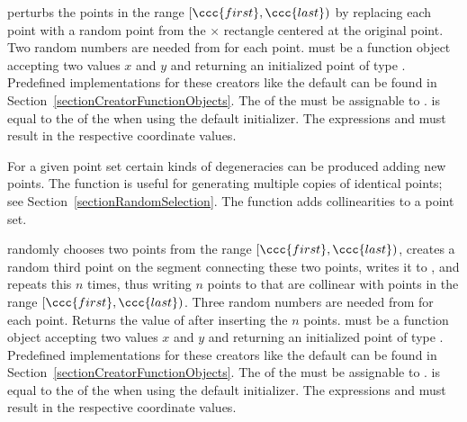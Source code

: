 { perturbs the points in the range $[\ccc{first},\ccc{last})$ by
  replacing each point with a random point from the 
   $\times$  rectangle centered at the original point.
  Two random numbers are needed from  for each point.
  \ccPrecond   {} must be a function object accepting two
     values $x$ and $y$ and returning an initialized point
     of type . Predefined implementations for these
    creators like the default can be found in
    Section~\ref{sectionCreatorFunctionObjects}. The  of the
     must be assignable to .
     is equal to the  of the
     when using the default initializer.
    The expressions  and
     must result in the respective
    coordinate values.
}


For a given point set certain kinds of degeneracies can be produced
adding new points. The  function is
useful for generating multiple copies of identical points; see
Section~\ref{sectionRandomSelection}. The
 function adds collinearities to
a point set.


\def\ccLongParamLayout{\ccTrue}
{ randomly chooses two points from the range $[\ccc{first},\ccc{last})$,
    creates a random third point on the segment connecting these two
    points, writes it to , and repeats this $n$ times, thus
    writing $n$ points to  that are collinear with points
    in the range $[\ccc{first},\ccc{last})$.
    Three random numbers are needed from  for each point.
    Returns the value of  after inserting the $n$ points.
  \ccPrecond  {} must be a function object accepting two
     values $x$ and $y$ and returning an initialized point
     of type . Predefined implementations for these
    creators like the default can be found in
    Section~\ref{sectionCreatorFunctionObjects}. The  of the
     must be assignable to .
     is equal to the  of the
     when using the default initializer.
    The expressions  and
     must result in the respective
    coordinate values.
}
\def\ccLongParamLayout{\ccFalse}


